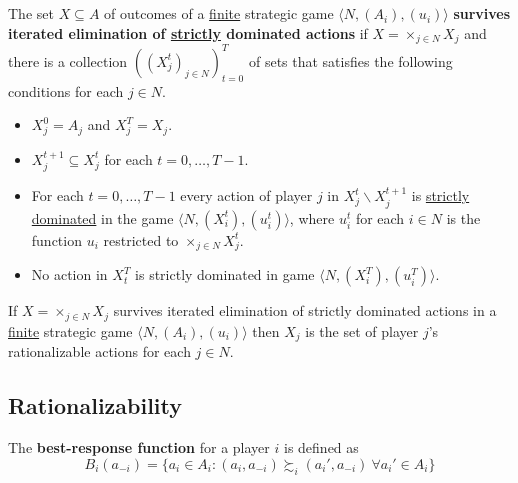 \documentclass[11pt]{article}
\begin{document}
	\newpage
	\section*{}
	\begin{definition}[60.2]
				The set $X \subseteq A$ of outcomes of a \ul{finite} strategic game $\langle N, (A_i), (u_i) \rangle$ \textbf{survives iterated elimination of \ul{strictly} dominated actions} if $X = \times_{j \in N} X_j$ and there is a collection $((X_j^t)_{j \in N})_{t=0}^T$ of sets that satisfies the following conditions for each $j \in N$.
				\begin{itemize}
					\item $X_j^0 = A_j$ and $X_j^T = X_j$.
					\item $X_j^{t+1} \subseteq X_j^t$ for each $t = 0, \dots, T - 1$.
					\item For each $t = 0, \dots, T-1$ every action of player $j$ in $X_j^t \backslash X_j^{t+1}$ is \ul{strictly dominated} in the game $\langle N, (X_i^t), (u_i^t) \rangle$, where $u_i^t$ for each $i \in N$ is the function $u_i$ restricted to $\times_{j \in N} X_j^t$.
					\item No action in $X_t^T$ is strictly dominated in game $\langle N, (X_i^T), (u_i^T) \rangle$.
				\end{itemize}
			\end{definition}
			
			\begin{proposition}[61.2]
				If $X = \times_{j \in N}X_j$ survives iterated elimination of strictly dominated actions in a \ul{finite} strategic game $\langle N, (A_i), (u_i) \rangle$ then $X_j$ is the set of player $j$'s rationalizable actions for each $j \in N$.
			\end{proposition}
			
		\subsection{Rationalizability}
			\begin{definition}[pg.15]
				The \textbf{best-response function} for a player $i$ is defined as
				\[
					B_i(a_{-i}) = \{a_i \in A_i : (a_i, a_{-i}) \succsim_i (a_i', a_{-i})\ \forall a_i' \in A_i \}
				\]
			\end{definition}
			
\end{document}
